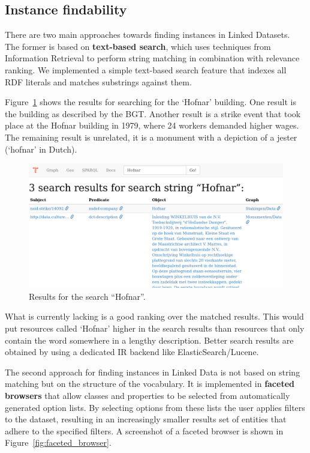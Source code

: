 \documentclass[a4paper]{scrartcl}
\begin{document}
\subsection{Instance findability}
\label{sec:instance_findability}

There are two main approaches towards finding instances in Linked
Datasets.  The former is based on \textbf{text-based search}, which
uses techniques from Information Retrieval to perform string matching
in combination with relevance ranking.  We implemented a simple
text-based search feature that indexes all RDF literals and matches
substrings against them.

Figure~\ref{fig:search} shows the results for searching for the
`Hofnar' building.  One result is the building as described by the
BGT.  Another result is a strike event that took place at the Hofnar
building in 1979, where 24 workers demanded higher wages.  The
remaining result is unrelated, it is a monument with a depiction of a
jester (`hofnar' in Dutch).

\begin{figure}
  \includegraphics[width=\linewidth]{img/search}
  \caption{Results for the search ``Hofnar''.}
  \label{fig:search}
\end{figure}

What is currently lacking is a good ranking over the matched results.
This would put resources called `Hofnar' higher in the search results
than resources that only contain the word somewhere in a lengthy
description.  Better search results are obtained by using a dedicated
IR backend like ElasticSearch/Lucene.

The second approach for finding instances in Linked Data is not based
on string matching but on the structure of the vocabulary.  It is
implemented in \textbf{faceted browsers} that allow classes and
properties to be selected from automatically generated option lists.
By selecting options from these lists the user applies filters to the
dataset, resulting in an increasingly smaller results set of entities
that adhere to the specified filters.  A screenshot of a faceted
browser is shown in Figure~\ref{fig:faceted_browser}.
\end{document}
